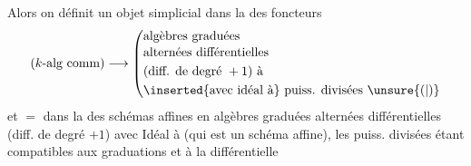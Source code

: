 Alors on définit un objet simplicial dans la  des foncteurs
\[
 (k\text{-alg comm})\longrightarrow
 \left(\begin{aligned}
 &\text{algèbres graduées}\\[-2pt]
 &\text{alternées différentielles}\\
 &\text{(diff. de degré }+1)\text{ à}\\
 &\inserted{\text{avec idéal à}}\text{ puiss. divisées }\unsure{(|)}
 \end{aligned}\right.
\]
et $=$ dans la  des  schémas affines  en algèbres graduées alternées différentielles (diff. de degré $+1$) avec Idéal  à  (qui est un schéma affine), les puiss. divisées étant compatibles aux graduations et à la différentielle
